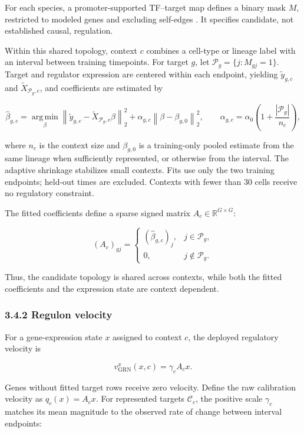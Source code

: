\documentclass[
  11pt,
  letterpaper,
]{article}
\begin{document}
For each species, a promoter-supported TF--target map defines a binary
mask \(M\), restricted to modeled genes and excluding self-edges
\parencite{kamimoto_dissecting_2023}. It specifies candidate, not established causal,
regulation.

Within this shared topology, context \(c\) combines a cell-type or
lineage label with an interval between training timepoints. For target \(g\), let
\(\mathcal P_g=\{j:M_{gj}=1\}\). Target and regulator expression are
centered within each endpoint, yielding \(\widetilde y_{g,c}\) and
\(\widetilde X_{\mathcal P_g,c}\), and coefficients are estimated by

\[
\widehat\beta_{g,c}
=\operatorname*{arg\,min}_{\beta}
\left\lVert
\widetilde y_{g,c}-\widetilde X_{\mathcal P_g,c}\beta
\right\rVert_2^2
+\alpha_{g,c}\left\lVert\beta-\beta_{g,0}\right\rVert_2^2,
\qquad
\alpha_{g,c}=\alpha_0\left(1+\frac{|\mathcal P_g|}{n_c}\right),
\]

where \(n_c\) is the context size and \(\beta_{g,0}\) is a training-only
pooled estimate from the same lineage when sufficiently represented, or
otherwise from the interval. The adaptive shrinkage stabilizes small
contexts. Fits use only the two training endpoints; held-out
times are excluded. Contexts with fewer than 30 cells receive no
regulatory constraint.

The fitted coefficients define a sparse signed matrix
\(A_c\in\mathbb{R}^{G\times G}\):

\[
(A_c)_{gj}
=
\begin{cases}
(\widehat\beta_{g,c})_j, & j\in\mathcal P_g,\\
0, & j\notin\mathcal P_g.
\end{cases}
\]

Thus, the candidate topology is shared across contexts, while both the
fitted coefficients and the expression state are context dependent.

\subsubsection{3.4.2 Regulon velocity}\label{regulon-velocity}

For a gene-expression state \(x\) assigned to context \(c\), the
deployed regulatory velocity is

\[
v_{\mathrm{GRN}}^x(x,c)=\gamma_c A_cx.
\]

Genes without fitted target rows receive zero velocity. Define the raw
calibration velocity as \(q_c(x)=A_cx\). For represented targets
\(\mathcal C_c\), the positive scale \(\gamma_c\) matches its mean
magnitude to the observed rate of change between interval endpoints:
\end{document}
